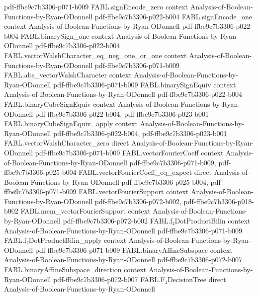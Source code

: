 \begin{theorem}
  {pdf-ffbe9c7b3306-p071-b009}
\proofstep
  {FABL.signEncode_zero}
  {context}
  {Analysis-of-Boolean-Functions-by-Ryan-ODonnell}
  {pdf-ffbe9c7b3306-p022-b004}
\proofstep
  {FABL.signEncode_one}
  {context}
  {Analysis-of-Boolean-Functions-by-Ryan-ODonnell}
  {pdf-ffbe9c7b3306-p022-b004}
\proofstep
  {FABL.binarySign_one}
  {context}
  {Analysis-of-Boolean-Functions-by-Ryan-ODonnell}
  {pdf-ffbe9c7b3306-p022-b004}
\proofstep
  {FABL.vectorWalshCharacter_eq_neg_one_or_one}
  {context}
  {Analysis-of-Boolean-Functions-by-Ryan-ODonnell}
  {pdf-ffbe9c7b3306-p071-b009}
\proofstep
  {FABL.abs_vectorWalshCharacter}
  {context}
  {Analysis-of-Boolean-Functions-by-Ryan-ODonnell}
  {pdf-ffbe9c7b3306-p071-b009}
\proofstep
  {FABL.binarySignEquiv}
  {context}
  {Analysis-of-Boolean-Functions-by-Ryan-ODonnell}
  {pdf-ffbe9c7b3306-p022-b004}
\proofstep
  {FABL.binaryCubeSignEquiv}
  {context}
  {Analysis-of-Boolean-Functions-by-Ryan-ODonnell}
  {pdf-ffbe9c7b3306-p022-b004,
    pdf-ffbe9c7b3306-p023-b001}
\proofstep
  {FABL.binaryCubeSignEquiv_apply}
  {context}
  {Analysis-of-Boolean-Functions-by-Ryan-ODonnell}
  {pdf-ffbe9c7b3306-p022-b004,
    pdf-ffbe9c7b3306-p023-b001}
\proofstep
  {FABL.vectorWalshCharacter_zero}
  {direct}
  {Analysis-of-Boolean-Functions-by-Ryan-ODonnell}
  {pdf-ffbe9c7b3306-p071-b009}
\proofstep
  {FABL.vectorFourierCoeff}
  {context}
  {Analysis-of-Boolean-Functions-by-Ryan-ODonnell}
  {pdf-ffbe9c7b3306-p071-b009,
    pdf-ffbe9c7b3306-p025-b004}
\proofstep
  {FABL.vectorFourierCoeff_eq_expect}
  {direct}
  {Analysis-of-Boolean-Functions-by-Ryan-ODonnell}
  {pdf-ffbe9c7b3306-p025-b004,
    pdf-ffbe9c7b3306-p071-b009}
\proofstep
  {FABL.vectorFourierSupport}
  {context}
  {Analysis-of-Boolean-Functions-by-Ryan-ODonnell}
  {pdf-ffbe9c7b3306-p072-b002,
    pdf-ffbe9c7b3306-p018-b002}
\proofstep
  {FABL.mem_vectorFourierSupport}
  {context}
  {Analysis-of-Boolean-Functions-by-Ryan-ODonnell}
  {pdf-ffbe9c7b3306-p072-b002}
\proofstep
  {FABL.f₂DotProductBilin}
  {context}
  {Analysis-of-Boolean-Functions-by-Ryan-ODonnell}
  {pdf-ffbe9c7b3306-p071-b009}
\proofstep
  {FABL.f₂DotProductBilin_apply}
  {context}
  {Analysis-of-Boolean-Functions-by-Ryan-ODonnell}
  {pdf-ffbe9c7b3306-p071-b009}
\proofstep
  {FABL.binaryAffineSubspace}
  {context}
  {Analysis-of-Boolean-Functions-by-Ryan-ODonnell}
  {pdf-ffbe9c7b3306-p072-b007}
\proofstep
  {FABL.binaryAffineSubspace_direction}
  {context}
  {Analysis-of-Boolean-Functions-by-Ryan-ODonnell}
  {pdf-ffbe9c7b3306-p072-b007}
\proofstep
  {FABL.F₂DecisionTree}
  {direct}
  {Analysis-of-Boolean-Functions-by-Ryan-ODonnell}

\end{theorem}
